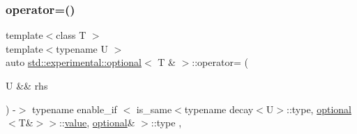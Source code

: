 \mbox{\label{classstd_1_1experimental_1_1optional_3_01_t_01_6_01_4_a0ccf7e1456d6cdfa46a0a0a6de2f88ba}} 
\subsubsection{\texorpdfstring{operator=()}{operator=()}\hspace{0.1cm}{\footnotesize\ttfamily [2/3]}}
{\footnotesize\ttfamily template$<$class T $>$ \\
template$<$typename U $>$ \\
auto \hyperlink{classstd_1_1experimental_1_1optional}{std\+::experimental\+::optional}$<$ T \& $>$\+::operator= (\begin{DoxyParamCaption}\item[{U \&\&}]{rhs }\end{DoxyParamCaption}) -\/$>$ typename enable\+\_\+if
                $<$
                    is\+\_\+same$<$typename decay$<$U$>$\+::type, \hyperlink{classstd_1_1experimental_1_1optional}{optional}$<$T\&$>$$>$\+::\hyperlink{classstd_1_1experimental_1_1optional_ad1277f09c288255dfe102b72e7107be6}{value},
                    \hyperlink{classstd_1_1experimental_1_1optional}{optional}\&
                $>$\+::type
            \hspace{0.3cm}{\ttfamily [inline]}, {\ttfamily [noexcept]}}

\mbox{\label{classstd_1_1experimental_1_1optional_3_01_t_01_6_01_4_aa0784b03df926b6eb712d1af5d7a7c24}} 
